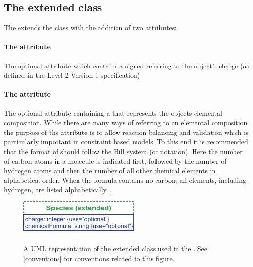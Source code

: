 \subsection{The extended  class}
\label{sbml-species}
\label{species-class}

The \FBCPackage extends the \sbmlthreecore \Species class with the addition of two attributes:

\paragraph{The  attribute}
The optional attribute  which contains a signed  referring to the \Species object's charge (as defined in the \SBML Level 2 Version 1 specification)

\paragraph{The  attribute}
\label{chemicalFormula-attribute}
The optional attribute  containing a  that represents the \Species objects elemental composition.
%
%
While there are many ways of referring to an elemental composition the purpose of the  attribute is to allow reaction balancing and validation which is particularly important in constraint based models. To this end it is recommended that the format of  should follow the Hill system (or notation). Here the number of carbon atoms in a molecule is indicated first, followed by the number of hydrogen atoms and then the number of all other chemical elements in alphabetical order. When the formula contains no carbon; all elements, including hydrogen, are listed alphabetically \cite{hillsystem, hillwikipedia}.
%
\begin{figure}[h]
  \centering
  \includegraphics[width=6cm]{images/fbc_uml_species.pdf}\\
  \caption{A UML representation of the extended \SBML \Species class used in the \FBCPackage. See \ref{conventions} for conventions related to this figure.}
  \label{fig:fbc_uml_species}
\end{figure}



